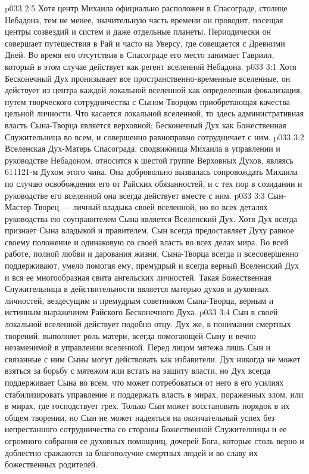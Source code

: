 \vs p033 2:5 \pc Хотя центр Михаила официально расположен в Спасограде, столице Небадона, тем не менее, значительную часть времени он проводит, посещая центры созвездий и систем и даже отдельные планеты. Периодически он совершает путешествия в Рай и часто на Уверсу, где совещается с Древними Дней. Во время его отсутствия в Спасограде его место занимает Гавриил, который в этом случае действует как регент вселенной Небадона.
\vs p033 3:1 Хотя Бесконечный Дух пронизывает все пространственно\hyp{}временные вселенные, он действует из центра каждой локальной вселенной как определенная фокализация, путем творческого сотрудничества с Сыном\hyp{}Творцом приобретающая качества цельной личности. Что касается локальной вселенной, то здесь административная власть Сына\hyp{}Творца является верховной; Бесконечный Дух как Божественная Служительница во всем, и совершенно равноправно сотрудничает с ним.
\vs p033 3:2 \pc Вселенская Дух\hyp{}Матерь Спасограда, сподвижница Михаила в управлении и руководстве Небадоном, относится к шестой группе Верховных Духов, являясь 611121\hyp{}м Духом этого чина. Она добровольно вызвалась сопровождать Михаила по случаю освобождения его от Райских обязанностей, и с тех пор в созидании и руководстве его вселенной она всегда действует вместе с ним.
\vs p033 3:3 \pc Сын\hyp{}Мастер\hyp{}Творец --- личный владыка своей вселенной, но во всех деталях руководства ею соуправителем Сына является Вселенский Дух. Хотя Дух всегда признает Сына владыкой и правителем, Сын всегда предоставляет Духу равное своему положение и одинаковую со своей власть во всех делах мира. Во всей работе, полной любви и дарования жизни, Сына\hyp{}Творца всегда и всесовершенно поддерживают, умело помогая ему, премудрый и всегда верный Вселенский Дух и вся ее многообразная свита ангельских личностей. Такая Божественная Служительница в действительности является матерью духов и духовных личностей, вездесущим и премудрым советником Сына\hyp{}Творца, верным и истинным выражением Райского Бесконечного Духа.
\vs p033 3:4 \pc Сын в своей локальной вселенной действует подобно отцу. Дух же, в понимании смертных творений, выполняет роль матери, всегда помогающей Сыну и вечно незаменимой в управлении вселенной. Перед лицом мятежа лишь Сын и связанные с ним Сыны могут действовать как избавители. Дух никогда не может взяться за борьбу с мятежом или встать на защиту власти, но Дух всегда поддерживает Сына во всем, что может потребоваться от него в его усилиях стабилизировать управление и поддержать власть в мирах, пораженных злом, или в мирах, где господствует грех. Только Сын может восстановить порядок в их общем творении, но Сын не может надеяться на окончательный успех без непрестанного сотрудничества со стороны Божественной Служителницы и ее огромного собрания ее духовных помощниц, дочерей Бога, которые столь верно и доблестно сражаются за благополучие смертных людей и во славу их божественных родителей.
